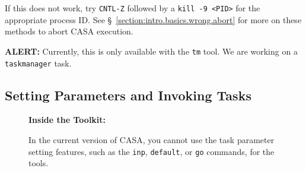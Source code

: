 If this does not work,
try {\tt CNTL-Z} followed by a {\tt kill -9 <PID>} for the appropriate
process ID.
See \S~\ref{section:intro.basics.wrong.abort} for more on these
methods to abort CASA execution.

{\bf ALERT:} Currently, this is only available with the 
{\tt tm} tool.  We are working on a {\tt taskmanager} task.

\subsection{Setting Parameters and Invoking Tasks}
\label{section:intro.tasks.setpar}

\begin{wrapfigure}{r}{2.5in}
  \begin{boxedminipage}{2.5in}
     \centerline{\bf Inside the Toolkit:}
     In the current version of CASA, you cannot use the
     task parameter setting features, such as the {\tt inp},
     {\tt default}, or {\tt go} commands, for the tools.
  \end{boxedminipage}
\end{wrapfigure}

